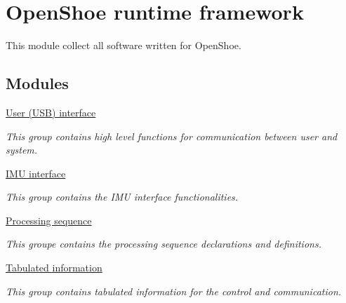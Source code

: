 \hypertarget{group__openshoe__runtime__framework}{
\section{\-Open\-Shoe runtime framework}
\label{group__openshoe__runtime__framework}
}


\-This module collect all software written for \-Open\-Shoe.  


\subsection*{\-Modules}
\begin{DoxyCompactItemize}
\item 
\hyperlink{group__user__interface}{\-User (\-U\-S\-B) interface}
\begin{DoxyCompactList}\small\item\em \-This group contains high level functions for communication between user and system. \end{DoxyCompactList}\item 
\hyperlink{group__imu__interface}{\-I\-M\-U interface}
\begin{DoxyCompactList}\small\item\em \-This group contains the \-I\-M\-U interface functionalities. \end{DoxyCompactList}\item 
\hyperlink{group__proc__sequence}{\-Processing sequence}
\begin{DoxyCompactList}\small\item\em \-This groupe contains the processing sequence declarations and definitions. \end{DoxyCompactList}\item 
\hyperlink{group__control__tables}{\-Tabulated information}
\begin{DoxyCompactList}\small\item\em \-This group contains tabulated information for the control and communication. \end{DoxyCompactList}\end{DoxyCompactItemize}
